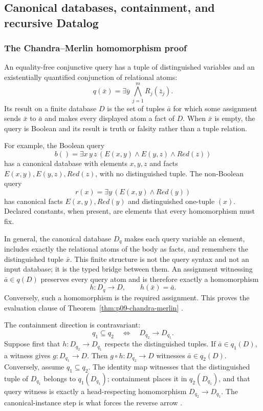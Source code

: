 
\subsection{Canonical databases, containment, and recursive Datalog}
\label{sec:p09-presentation-n-c-024}

\subsubsection{The Chandra--Merlin homomorphism proof}

An equality-free conjunctive query has a tuple of distinguished variables and
an existentially quantified conjunction of relational atoms:
\[
 q(\bar x)=\exists\bar y\,
   \bigwedge_{j=1}^{m}R_j(\bar z_j).
\]
Its result on a finite database \(D\) is the set of tuples \(\bar a\) for which
some assignment sends \(\bar x\) to \(\bar a\) and makes every displayed atom
a fact of \(D\).  When \(\bar x\) is empty, the query is Boolean and its result
is truth or falsity rather than a tuple relation.

For example, the Boolean query
\[
 b()=\exists x\,y\,z\,
   (E(x,y)\land E(y,z)\land Red(z))
\]
has a canonical database with elements \(x,y,z\) and facts
\(E(x,y),E(y,z),Red(z)\), with no distinguished tuple.  The non-Boolean query
\[
 r(x)=\exists y\,(E(x,y)\land Red(y))
\]
has canonical facts \(E(x,y),Red(y)\) and distinguished one-tuple \((x)\).
Declared constants, when present, are elements that every homomorphism must
fix.

In general, the canonical database \(D_q\) makes each query variable an
element, includes exactly the relational atoms of the body as facts, and
remembers the distinguished tuple \(\bar x\).  This finite structure is not the
query syntax and not an input database; it is the typed bridge between them.
An assignment witnessing \(\bar a\in q(D)\) preserves every query atom and is
therefore exactly a homomorphism
\[
 h:D_q\longrightarrow D,
 \qquad h(\bar x)=\bar a.
\]
Conversely, such a homomorphism is the required assignment.  This proves the
evaluation clause of Theorem~\ref{thm:p09-chandra-merlin}
\cite[pp.~78--82]{ChandraMerlin1977}.

The containment direction is contravariant:
\[
 q_1\subseteq q_2
 \quad\Longleftrightarrow\quad
 D_{q_2}\longrightarrow D_{q_1}.
\]
Suppose first that \(h:D_{q_2}\to D_{q_1}\) respects the distinguished tuples.
If \(\bar a\in q_1(D)\), a witness gives
\(g:D_{q_1}\to D\).  Then \(g\circ h:D_{q_2}\to D\) witnesses
\(\bar a\in q_2(D)\).  Conversely, assume \(q_1\subseteq q_2\).  The identity
map witnesses that the distinguished tuple of \(D_{q_1}\) belongs to
\(q_1(D_{q_1})\); containment places it in \(q_2(D_{q_1})\), and that query
witness is exactly a head-respecting homomorphism
\(D_{q_2}\to D_{q_1}\).  The canonical-instance step is what forces the reverse
arrow \cite[pp.~82--85]{ChandraMerlin1977}.

